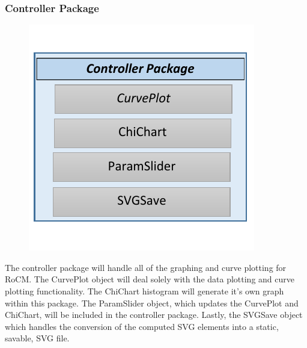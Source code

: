 \documentclass[titlepage]{article}
\begin{document}
\subsubsection{Controller Package}
\begin{minipage}{\textwidth}
\begin{figure}
  \vspace{-20pt}
  \begin{center}
	\includegraphics{controller_package.pdf}
  \end{center}
\end{figure}
The controller package will handle all of the graphing and curve plotting for RoCM. The CurvePlot object will deal solely with the data plotting and curve plotting functionality. The ChiChart histogram will generate it's own graph within this package. The ParamSlider object, which updates the CurvePlot and ChiChart, will be included in the controller package. Lastly, the SVGSave object which handles the conversion of the computed SVG elements into a static, savable, SVG file.
\end{minipage}

\vspace{+100pt}
\end{document}
